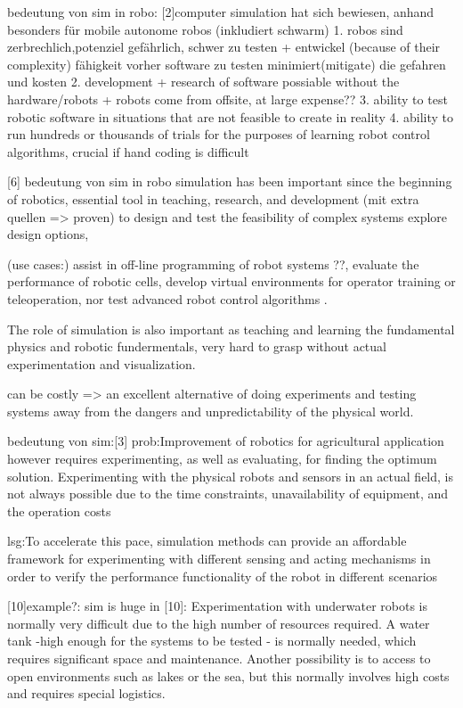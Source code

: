 \documentclass[german,version-2020-11]{uzl-thesis}
\begin{document}
bedeutung von sim in robo:
[2]computer simulation hat sich bewiesen, anhand
  besonders für mobile autonome robos (inkludiert schwarm)
  1. robos sind zerbrechlich,potenziel gefährlich, schwer zu testen + entwickel (because of their complexity)
  fähigkeit vorher software zu testen minimiert(mitigate) die gefahren und kosten
  2. development + research of software possiable without the hardware/robots
    + robots come from offsite, at large expense??
  3. ability to test robotic software in situations that are not feasible to create in reality
  4. ability to run hundreds or thousands of trials for the purposes of learning robot control algorithms, crucial if hand coding is difficult

[6] bedeutung von sim in robo
    simulation has been important since the beginning of robotics,
    essential tool in teaching, research, and development  (mit extra quellen => proven)
    to design and test the feasibility of complex systems
    explore design options, 
    
    (use cases:)
    assist in off-line programming of robot systems ??,
     evaluate the performance of robotic cells,
    develop virtual environments for operator training or teleoperation, 
    nor test advanced robot control algorithms .
    
    The role of simulation is also important as teaching and learning the fundamental physics and robotic fundermentals, very hard to grasp without actual experimentation and visualization. 
    
    can be costly => an excellent alternative of doing experiments and testing systems away from the dangers and unpredictability of the physical world.

    bedeutung von sim:[3]
    prob:Improvement of robotics for agricultural application however requires experimenting, as well as evaluating, for finding the optimum solution. Experimenting with the physical robots and sensors in an actual field, is not always possible due to the time constraints, unavailability of equipment, and the operation costs
    
    lsg:To accelerate this pace, simulation methods can provide an affordable framework for experimenting with different sensing and acting mechanisms in order to verify the performance functionality of the robot in different scenarios


[10]example?: sim is huge in [10]:
      Experimentation with underwater robots is normally very difficult due to the high number of resources required.
        A water tank -high enough for the systems to be tested - is normally needed, 
          which requires significant space and maintenance. 
        Another possibility is to access to open environments such as lakes or the sea, but this normally involves high costs and requires special logistics. 
        
\end{document}
